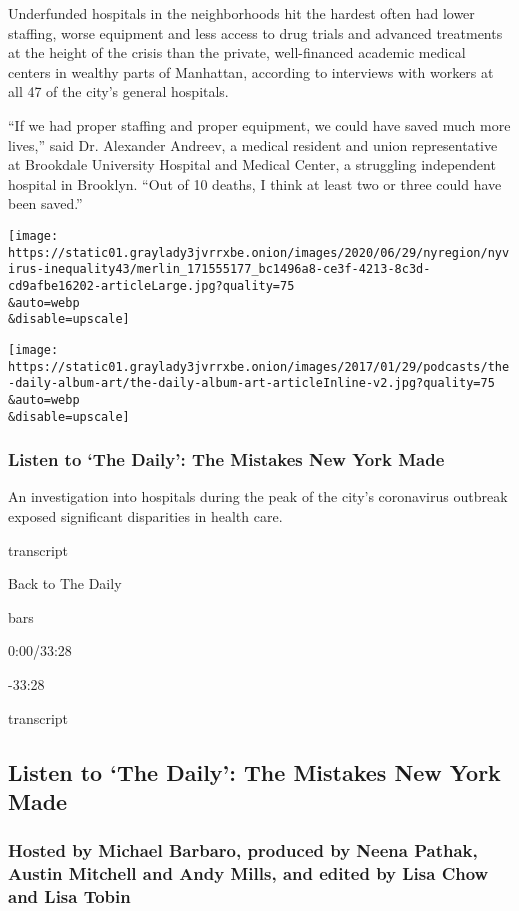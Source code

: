 Underfunded hospitals in the neighborhoods hit the hardest often had
lower staffing, worse equipment and less access to drug trials and
advanced treatments at the height of the crisis than the private,
well-financed academic medical centers in wealthy parts of Manhattan,
according to interviews with workers at all 47 of the city's general
hospitals.

``If we had proper staffing and proper equipment, we could have saved
much more lives,'' said Dr. Alexander Andreev, a medical resident and
union representative at Brookdale University Hospital and Medical
Center, a struggling independent hospital in Brooklyn. ``Out of 10
deaths, I think at least two or three could have been saved.''

\texttt{[image: https://static01.graylady3jvrrxbe.onion/images/2020/06/29/nyregion/nyvirus-inequality43/merlin\_171555177\_bc1496a8-ce3f-4213-8c3d-cd9afbe16202-articleLarge.jpg?quality=75\\\&auto=webp\\\&disable=upscale]}

\texttt{[image: https://static01.graylady3jvrrxbe.onion/images/2017/01/29/podcasts/the-daily-album-art/the-daily-album-art-articleInline-v2.jpg?quality=75\\\&auto=webp\\\&disable=upscale]}

\hypertarget{listen-to-the-daily-the-mistakes-new-york-made}{%
\subsubsection{Listen to `The Daily': The Mistakes New York
Made}\label{listen-to-the-daily-the-mistakes-new-york-made}}

An investigation into hospitals during the peak of the city's
coronavirus outbreak exposed significant disparities in health care.

transcript

Back to The Daily

bars

0:00/33:28

-33:28

transcript

\hypertarget{listen-to-the-daily-the-mistakes-new-york-made-1}{%
\subsection{Listen to `The Daily': The Mistakes New York
Made}\label{listen-to-the-daily-the-mistakes-new-york-made-1}}

\hypertarget{hosted-by-michael-barbaro-produced-by-neena-pathak-austin-mitchell-and-andy-mills-and-edited-by-lisa-chow-and-lisa-tobin}{%
\subsubsection{Hosted by Michael Barbaro, produced by Neena Pathak,
Austin Mitchell and Andy Mills, and edited by Lisa Chow and Lisa
Tobin}\label{hosted-by-michael-barbaro-produced-by-neena-pathak-austin-mitchell-and-andy-mills-and-edited-by-lisa-chow-and-lisa-tobin}}

